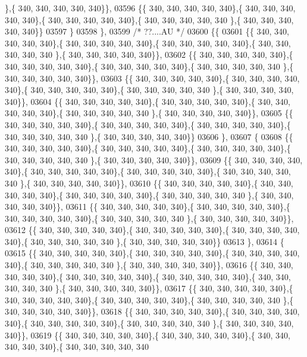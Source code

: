 \begin{DoxyCode}
      \},\{ 340, 340, 340, 340, 340\}\},
03596 \{\{ 340, 340, 340, 340, 340\},\{ 340, 340, 340, 340, 340\},\{ 340, 340, 340, 340, 340\},\{ 340, 340, 340, 340, 340
      \},\{ 340, 340, 340, 340, 340\}\}
03597 \}
03598 \},
03599 \textcolor{comment}{/* ??....AU */}
03600 \{\{
03601 \{\{ 340, 340, 340, 340, 340\},\{ 340, 340, 340, 340, 340\},\{ 340, 340, 340, 340, 340\},\{ 340, 340, 340, 340, 340
      \},\{ 340, 340, 340, 340, 340\}\},
03602 \{\{ 340, 340, 340, 340, 340\},\{ 340, 340, 340, 340, 340\},\{ 340, 340, 340, 340, 340\},\{ 340, 340, 340, 340, 340
      \},\{ 340, 340, 340, 340, 340\}\},
03603 \{\{ 340, 340, 340, 340, 340\},\{ 340, 340, 340, 340, 340\},\{ 340, 340, 340, 340, 340\},\{ 340, 340, 340, 340, 340
      \},\{ 340, 340, 340, 340, 340\}\},
03604 \{\{ 340, 340, 340, 340, 340\},\{ 340, 340, 340, 340, 340\},\{ 340, 340, 340, 340, 340\},\{ 340, 340, 340, 340, 340
      \},\{ 340, 340, 340, 340, 340\}\},
03605 \{\{ 340, 340, 340, 340, 340\},\{ 340, 340, 340, 340, 340\},\{ 340, 340, 340, 340, 340\},\{ 340, 340, 340, 340, 340
      \},\{ 340, 340, 340, 340, 340\}\}
03606 \},
03607 \{
03608 \{\{ 340, 340, 340, 340, 340\},\{ 340, 340, 340, 340, 340\},\{ 340, 340, 340, 340, 340\},\{ 340, 340, 340, 340, 340
      \},\{ 340, 340, 340, 340, 340\}\},
03609 \{\{ 340, 340, 340, 340, 340\},\{ 340, 340, 340, 340, 340\},\{ 340, 340, 340, 340, 340\},\{ 340, 340, 340, 340, 340
      \},\{ 340, 340, 340, 340, 340\}\},
03610 \{\{ 340, 340, 340, 340, 340\},\{ 340, 340, 340, 340, 340\},\{ 340, 340, 340, 340, 340\},\{ 340, 340, 340, 340, 340
      \},\{ 340, 340, 340, 340, 340\}\},
03611 \{\{ 340, 340, 340, 340, 340\},\{ 340, 340, 340, 340, 340\},\{ 340, 340, 340, 340, 340\},\{ 340, 340, 340, 340, 340
      \},\{ 340, 340, 340, 340, 340\}\},
03612 \{\{ 340, 340, 340, 340, 340\},\{ 340, 340, 340, 340, 340\},\{ 340, 340, 340, 340, 340\},\{ 340, 340, 340, 340, 340
      \},\{ 340, 340, 340, 340, 340\}\}
03613 \},
03614 \{
03615 \{\{ 340, 340, 340, 340, 340\},\{ 340, 340, 340, 340, 340\},\{ 340, 340, 340, 340, 340\},\{ 340, 340, 340, 340, 340
      \},\{ 340, 340, 340, 340, 340\}\},
03616 \{\{ 340, 340, 340, 340, 340\},\{ 340, 340, 340, 340, 340\},\{ 340, 340, 340, 340, 340\},\{ 340, 340, 340, 340, 340
      \},\{ 340, 340, 340, 340, 340\}\},
03617 \{\{ 340, 340, 340, 340, 340\},\{ 340, 340, 340, 340, 340\},\{ 340, 340, 340, 340, 340\},\{ 340, 340, 340, 340, 340
      \},\{ 340, 340, 340, 340, 340\}\},
03618 \{\{ 340, 340, 340, 340, 340\},\{ 340, 340, 340, 340, 340\},\{ 340, 340, 340, 340, 340\},\{ 340, 340, 340, 340, 340
      \},\{ 340, 340, 340, 340, 340\}\},
03619 \{\{ 340, 340, 340, 340, 340\},\{ 340, 340, 340, 340, 340\},\{ 340, 340, 340, 340, 340\},\{ 340, 340, 340, 340, 340

\end{DoxyCode}

